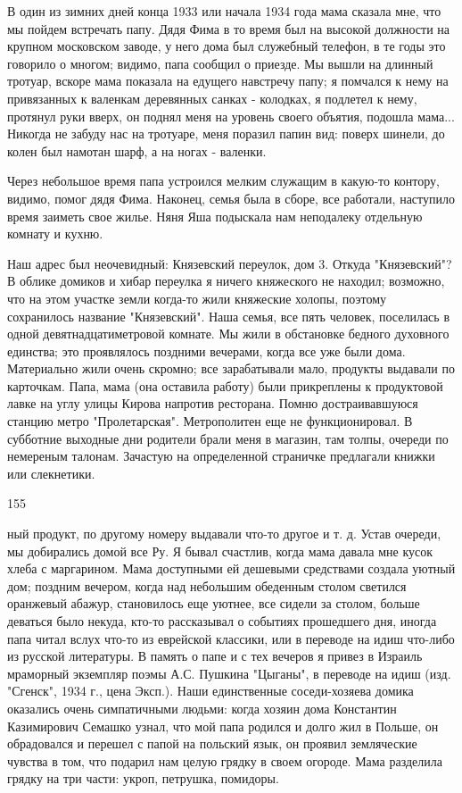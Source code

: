В один из зимних дней конца 1933 или начала 1934 года мама сказала мне, что мы пойдем встречать папу. Дядя Фима в то время был на высокой должности на крупном московском заводе, у него дома был служебный телефон, в те годы это говорило о многом; видимо, папа сообщил о приезде. Мы вышли на длинный тротуар, вскоре мама показала на едущего навстречу папу; я помчался к нему на привязанных к валенкам деревянных санках - колодках, я подлетел к нему, протянул руки вверх, он поднял меня на уровень своего объятия, подошла мама... Никогда не забуду нас на тротуаре, меня поразил папин вид: поверх шинели, до колен был намотан шарф, а на ногах - валенки.

Через небольшое время папа устроился мелким служащим в какую-то контору, видимо, помог дядя Фима. Наконец, семья была в сборе, все работали, наступило время заиметь свое жилье. Няня Яша подыскала нам неподалеку отдельную комнату и кухню.

Наш адрес был неочевидный: Князевский переулок, дом 3. Откуда "Князевский"? В облике домиков и хибар переулка я ничего княжеского не находил; возможно, что на этом участке земли когда-то жили княжеские холопы, поэтому сохранилось название "Князевский". Наша семья, все пять человек, поселилась в одной девятнадцатиметровой комнате. Мы жили в обстановке бедного духовного единства; это проявлялось поздними вечерами, когда все уже были дома. Материально жили очень скромно; все зарабатывали мало, продукты выдавали по карточкам. Папа, мама (она оставила работу) были прикреплены к продуктовой лавке на углу улицы Кирова напротив ресторана. Помню достраивавшуюся станцию метро "Пролетарская". Метрополитен еще не функционировал. В субботние выходные дни родители брали меня в магазин, там толпы, очереди по немереным талонам. Зачастую на определенной страничке предлагали книжки или слекнетики.

155

ный продукт, по другому номеру выдавали что-то другое и т. д. Устав очереди, мы добирались домой все Ру. Я бывал счастлив, когда мама давала мне кусок хлеба с маргарином. Мама доступными ей дешевыми средствами создала уютный дом; поздним вечером, когда над небольшим обеденным столом светился оранжевый абажур, становилось еще уютнее, все сидели за столом, больше деваться было некуда, кто-то рассказывал о событиях прошедшего дня, иногда папа читал вслух что-то из еврейской классики, или в переводе на идиш что-либо из русской литературы. В память о папе и с тех вечеров я привез в Израиль мраморный экземпляр поэмы А.С. Пушкина "Цыганы", в переводе на идиш (изд. "Сгенск", 1934 г., цена Эксп.). Наши единственные соседи-хозяева домика оказались очень симпатичными людьми: когда хозяин дома Константин Казимирович Семашко узнал, что мой папа родился и долго жил в Польше, он обрадовался и перешел с папой на польский язык, он проявил земляческие чувства в том, что подарил нам целую грядку в своем огороде. Мама разделила грядку на три части: укроп, петрушка, помидоры.


